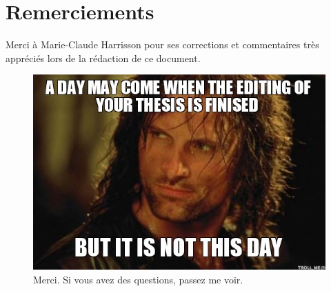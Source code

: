 \documentclass[../exemple_master.tex]{subfiles}
\begin{document}
\section{Remerciements}

Merci à Marie-Claude Harrisson pour ses corrections et commentaires très appréciés lors de la rédaction de ce document.

\begin{figure}[!tbh]
    \centering
    \includegraphics[width=0.5\columnwidth]{img/thesis}
    \caption{Merci. Si vous avez des questions, passez me voir.}
    \label{fig2_exemple}
\end{figure}
\end{document}
